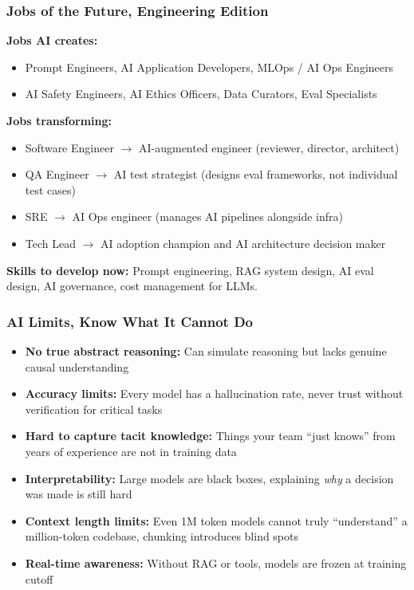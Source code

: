\begin{frame}[fragile]\frametitle{Jobs of the Future, Engineering Edition}
\textbf{Jobs AI creates:}
\begin{itemize}
\item Prompt Engineers, AI Application Developers, MLOps / AI Ops Engineers
\item AI Safety Engineers, AI Ethics Officers, Data Curators, Eval Specialists
\end{itemize}

\textbf{Jobs transforming:}
\begin{itemize}
\item Software Engineer $\rightarrow$ AI-augmented engineer (reviewer, director, architect)
\item QA Engineer $\rightarrow$ AI test strategist (designs eval frameworks, not individual test cases)
\item SRE $\rightarrow$ AI Ops engineer (manages AI pipelines alongside infra)
\item Tech Lead $\rightarrow$ AI adoption champion and AI architecture decision maker
\end{itemize}

\textbf{Skills to develop now:} Prompt engineering, RAG system design, AI eval design, AI governance, cost management for LLMs.
\end{frame}

\begin{frame}[fragile]\frametitle{AI Limits, Know What It Cannot Do}
\begin{itemize}
\item \textbf{No true abstract reasoning:} Can simulate reasoning but lacks genuine causal understanding
\item \textbf{Accuracy limits:} Every model has a hallucination rate, never trust without verification for critical tasks
\item \textbf{Hard to capture tacit knowledge:} Things your team ``just knows'' from years of experience are not in training data
\item \textbf{Interpretability:} Large models are black boxes, explaining \textit{why} a decision was made is still hard
\item \textbf{Context length limits:} Even 1M token models cannot truly ``understand'' a million-token codebase, chunking introduces blind spots
\item \textbf{Real-time awareness:} Without RAG or tools, models are frozen at training cutoff
\end{itemize}
\end{frame}


